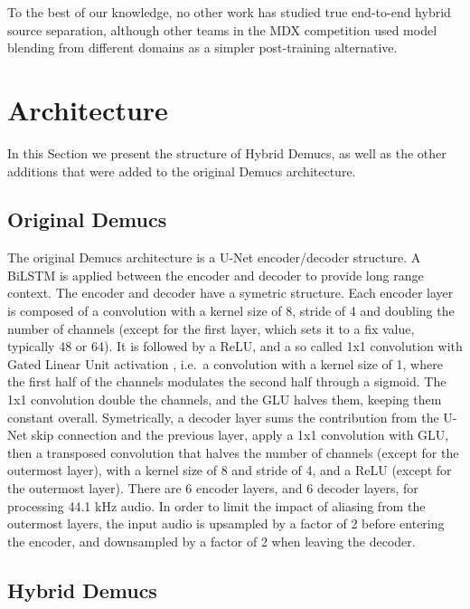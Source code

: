 \documentclass[10pt,a4paper,onecolumn]{article}
\begin{document}
To the best of our knowledge, no other work has studied true end-to-end
hybrid source separation, although other teams in the MDX competition
used model blending from different domains as a simpler post-training
alternative.

\hypertarget{architecture}{%
\section{Architecture}\label{architecture}}

In this Section we present the structure of Hybrid Demucs, as well as
the other additions that were added to the original Demucs architecture.

\hypertarget{original-demucs}{%
\subsection{Original Demucs}\label{original-demucs}}

The original Demucs architecture \citep{demucs} is a U-Net \citep{unet}
encoder/decoder structure. A BiLSTM \citep{lstm} is applied between the
encoder and decoder to provide long range context. The encoder and
decoder have a symetric structure. Each encoder layer is composed of a
convolution with a kernel size of 8, stride of 4 and doubling the number
of channels (except for the first layer, which sets it to a fix value,
typically 48 or 64). It is followed by a ReLU, and a so called 1x1
convolution with Gated Linear Unit activation \citep{glu}, i.e.~a
convolution with a kernel size of 1, where the first half of the
channels modulates the second half through a sigmoid. The 1x1
convolution double the channels, and the GLU halves them, keeping them
constant overall. Symetrically, a decoder layer sums the contribution
from the U-Net skip connection and the previous layer, apply a 1x1
convolution with GLU, then a transposed convolution that halves the
number of channels (except for the outermost layer), with a kernel size
of 8 and stride of 4, and a ReLU (except for the outermost layer). There
are 6 encoder layers, and 6 decoder layers, for processing 44.1 kHz
audio. In order to limit the impact of aliasing from the outermost
layers, the input audio is upsampled by a factor of 2 before entering
the encoder, and downsampled by a factor of 2 when leaving the decoder.

\hypertarget{hybrid-demucs}{%
\subsection{Hybrid Demucs}\label{hybrid-demucs}}
\end{document}
